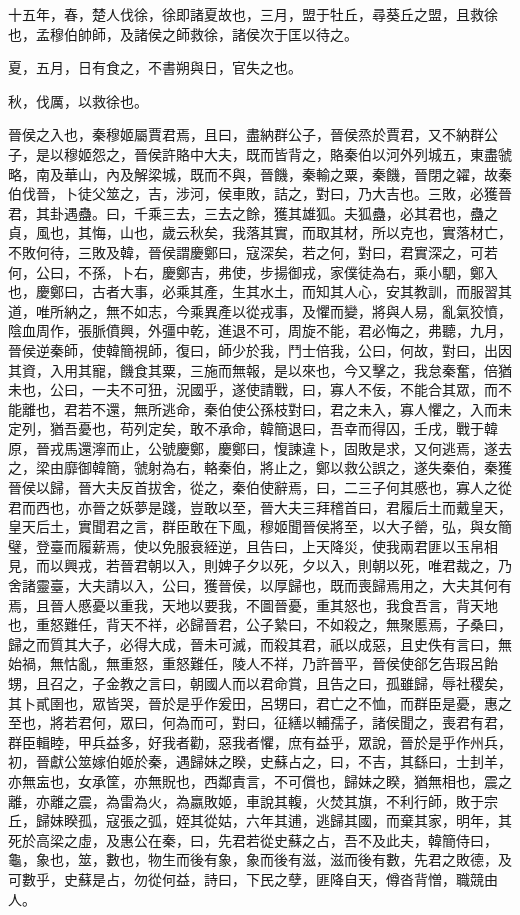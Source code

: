 \begin{pinyinscope}
十五年，春，楚人伐徐，徐即諸夏故也，三月，盟于牡丘，尋葵丘之盟，且救徐也，孟穆伯帥師，及諸侯之師救徐，諸侯次于匡以待之。

夏，五月，日有食之，不書朔與日，官失之也。

秋，伐厲，以救徐也。

晉侯之入也，秦穆姬屬賈君焉，且曰，盡納群公子，晉侯烝於賈君，又不納群公子，是以穆姬怨之，晉侯許賂中大夫，既而皆背之，賂秦伯以河外列城五，東盡虢略，南及華山，內及解梁城，既而不與，晉饑，秦輸之粟，秦饑，晉閉之糴，故秦伯伐晉，卜徒父筮之，吉，涉河，侯車敗，詰之，對曰，乃大吉也。三敗，必獲晉君，其卦遇蠱。曰，千乘三去，三去之餘，獲其雄狐。夫狐蠱，必其君也，蠱之貞，風也，其悔，山也，歲云秋矣，我落其實，而取其材，所以克也，實落材亡，不敗何待，三敗及韓，晉侯謂慶鄭曰，寇深矣，若之何，對曰，君實深之，可若何，公曰，不孫，卜右，慶鄭吉，弗使，步揚御戎，家僕徒為右，乘小駟，鄭入也，慶鄭曰，古者大事，必乘其產，生其水土，而知其人心，安其教訓，而服習其道，唯所納之，無不如志，今乘異產以從戎事，及懼而變，將與人易，亂氣狡憤，陰血周作，張脈僨興，外彊中乾，進退不可，周旋不能，君必悔之，弗聽，九月，晉侯逆秦師，使韓簡視師，復曰，師少於我，鬥士倍我，公曰，何故，對曰，出因其資，入用其寵，饑食其粟，三施而無報，是以來也，今又擊之，我怠秦奮，倍猶未也，公曰，一夫不可狃，況國乎，遂使請戰，曰，寡人不佞，不能合其眾，而不能離也，君若不還，無所逃命，秦伯使公孫枝對曰，君之未入，寡人懼之，入而未定列，猶吾憂也，苟列定矣，敢不承命，韓簡退曰，吾幸而得囚，壬戌，戰于韓原，晉戎馬還濘而止，公號慶鄭，慶鄭曰，愎諫違卜，固敗是求，又何逃焉，遂去之，梁由靡御韓簡，虢射為右，輅秦伯，將止之，鄭以救公誤之，遂失秦伯，秦獲晉侯以歸，晉大夫反首拔舍，從之，秦伯使辭焉，曰，二三子何其慼也，寡人之從君而西也，亦晉之妖夢是踐，豈敢以至，晉大夫三拜稽首曰，君履后土而戴皇天，皇天后土，實聞君之言，群臣敢在下風，穆姬聞晉侯將至，以大子罃，弘，與女簡璧，登臺而履薪焉，使以免服衰絰逆，且告曰，上天降災，使我兩君匪以玉帛相見，而以興戎，若晉君朝以入，則婢子夕以死，夕以入，則朝以死，唯君裁之，乃舍諸靈臺，大夫請以入，公曰，獲晉侯，以厚歸也，既而喪歸焉用之，大夫其何有焉，且晉人慼憂以重我，天地以要我，不圖晉憂，重其怒也，我食吾言，背天地也，重怒難任，背天不祥，必歸晉君，公子縶曰，不如殺之，無聚慝焉，子桑曰，歸之而質其大子，必得大成，晉未可滅，而殺其君，祇以成惡，且史佚有言曰，無始禍，無怙亂，無重怒，重怒難任，陵人不祥，乃許晉平，晉侯使郤乞告瑕呂飴甥，且召之，子金教之言曰，朝國人而以君命賞，且告之曰，孤雖歸，辱社稷矣，其卜貳圉也，眾皆哭，晉於是乎作爰田，呂甥曰，君亡之不恤，而群臣是憂，惠之至也，將若君何，眾曰，何為而可，對曰，征繕以輔孺子，諸侯聞之，喪君有君，群臣輯睦，甲兵益多，好我者勸，惡我者懼，庶有益乎，眾說，晉於是乎作州兵，初，晉獻公筮嫁伯姬於秦，遇歸妹之睽，史蘇占之，曰，不吉，其繇曰，士刲羊，亦無衁也，女承筐，亦無貺也，西鄰責言，不可償也，歸妹之睽，猶無相也，震之離，亦離之震，為雷為火，為嬴敗姬，車說其輹，火焚其旗，不利行師，敗于宗丘，歸妹睽孤，寇張之弧，姪其從姑，六年其逋，逃歸其國，而棄其家，明年，其死於高梁之虛，及惠公在秦，曰，先君若從史蘇之占，吾不及此夫，韓簡侍曰，龜，象也，筮，數也，物生而後有象，象而後有滋，滋而後有數，先君之敗德，及可數乎，史蘇是占，勿從何益，詩曰，下民之孽，匪降自天，僔沓背憎，職競由人。


\end{pinyinscope}
